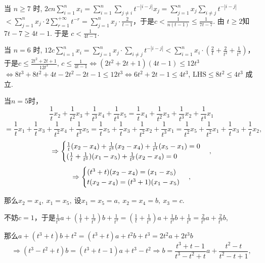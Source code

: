 \documentclass[lang=cn,12pt,thmcnt=section]{elegantbook}
\begin{document}
\begin{solution}
当 \( n \geq 7 \) 时, \( 2cn \sum_{i = 1}^{n} x_i = \sum_{i = 1}^{n} \sum_{j \neq i} t^{-|i - j|} x_j = \sum_{j = 1}^{n} x_j \sum_{i \neq j} t^{-|i - j|} \)
\( < \sum_{j = 1}^{n} x_j \cdot 2 \sum_{r = 1}^{+\infty} t^{-r} = \sum_{j = 1}^{n} x_j \cdot \frac{2}{t - 1} \)，于是\( c < \frac{1}{n(t - 1)} \leq \frac{1}{7t - 7} \).
由 \( t \geq 2 \)知 \( 7t - 7 \ge 4t - 1\). 于是 \( c < \frac{1}{4t - 1} \).


当 \( n = 6 \) 时, \( 12c \sum_{i = 1}^{n} x_i = \sum_{j = 1}^{n} x_j \cdot \sum_{i \neq j} t^{-|i - j|} < \sum_{i = 1}^{n} x_i \cdot (\frac{2}{t} + \frac{2}{t^2} + \frac{1}{t^3}) \)，
于是\( c \leq \frac{2t^2 + 2t + 1}{12t^3} \), \( c \leq \frac{1}{4t - 1} \Leftrightarrow (2t^2 + 2t + 1) (4t - 1) \leq 12t^3 \)
\( \Leftrightarrow 8t^3 + 8t^2 + 4t - 2t^2 - 2t - 1 \leq 12t^3 \Leftrightarrow 6t^2 + 2t  - 1 \le 4t^3 \), \( \text{LHS} \leq 8t^2 \leq 4t^3 \) 成立.

当$n = 5$时，
\[
\frac{1}{t}x_2 + \frac{1}{t^2}x_3 + \frac{1}{t^3}x_4 + \frac{1}{t^4}x_5 = \frac{1}{t}x_4 + \frac{1}{t^2}x_3 + \frac{1}{t^3}x_2 + \frac{1}{t^4}x_1
\]
\[
=\frac{1}{t}x_1 + \frac{1}{t}x_3 + \frac{1}{t^2}x_4 + \frac{1}{t^3}x_5 = \frac{1}{t}x_5 + \frac{1}{t}x_3 + \frac{1}{t^2}x_2 + \frac{1}{t^3}x_1 = \frac{1}{t^2}x_5 + \frac{1}{t^2}x_1 + \frac{1}{t}x_3 + \frac{1}{t}x_2,
\]
\[
\Rightarrow
\begin{cases}
\frac{1}{t}(x_2 - x_4) + \frac{1}{t^3}(x_2 - x_4) + \frac{1}{t^4}(x_5 - x_1) = 0\\
(\frac{1}{t} + \frac{1}{t^3})(x_1 - x_5) + \frac{1}{t^2}(x_2 - x_4) = 0
\end{cases}\\,
\]
\[
\Rightarrow
\begin{cases}
(t^3 + t)(x_2 - x_4) = (x_1 - x_5)\\
t(x_2 - x_4) = (t^3 + 1)(x_1 - x_5)
\end{cases}\\,
\]

那么$ x_2 = x_4, \ x_1 = x_5, \ 设x_1 = x_5 = a, \ x_2 = x_4 = b, \ x_3 = c. \ $

不妨$c = 1$，于是$ \frac{1}{t^4}a + (\frac{1}{t} + \frac{1}{t^3})b + \frac{1}{t^2} = (\frac{1}{t} + \frac{1}{t^3})a + \frac{1}{t^2}b + \frac{1}{t^4} = \frac{2}{t^2}a + \frac{2}{t^3}b$,

那么$a + (t^3 + t)b + t^2 = (t^3 + t)a + t^2b + t^3 = 2t^2a + 2t^3b$
\[
\Rightarrow (t^{3}-t^{2}+t)b=(t^{3}+t - 1)a+t^{3}-t^{2}\Rightarrow b=\frac{t^{3}+t - 1}{t^{3}-t^{2}+t}a+\frac{t^{2}-t}{t^{2}-t + 1},
\]


\end{solution}
\end{document}
